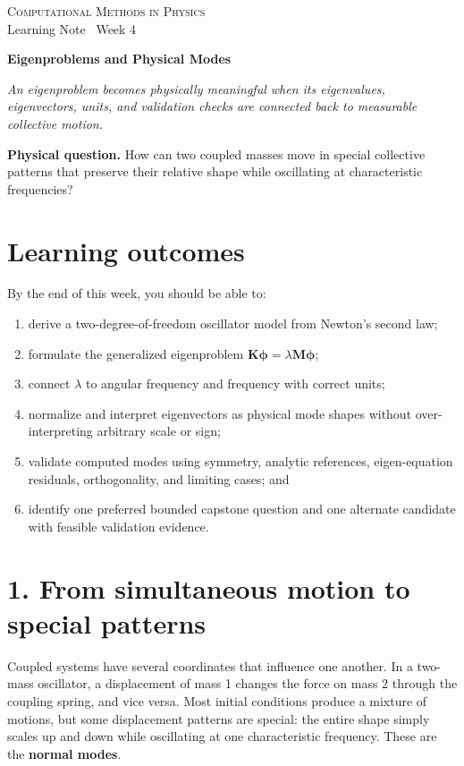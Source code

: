 \documentclass[11pt,a4paper]{article}
\newcommand{\course}{Computational Methods in Physics}
\begin{document}
{\large\textsc{\course}}\\[-2pt]
{\small Learning Note \textbar\ Week 4}\par\vspace{4pt}
{\LARGE\bfseries Eigenproblems and Physical Modes}\par\vspace{3pt}
\textit{An eigenproblem becomes physically meaningful when its eigenvalues, eigenvectors, units, and validation checks are connected back to measurable collective motion.}

\begin{keybox}
\textbf{Physical question.} How can two coupled masses move in special collective patterns that preserve their relative shape while oscillating at characteristic frequencies?
\end{keybox}

\section*{Learning outcomes}
By the end of this week, you should be able to:
\begin{enumerate}[nosep,leftmargin=5mm]
  \item derive a two-degree-of-freedom oscillator model from Newton's second law;
  \item formulate the generalized eigenproblem $\mathbf{K}\boldsymbol{\phi}=\lambda\mathbf{M}\boldsymbol{\phi}$;
  \item connect $\lambda$ to angular frequency and frequency with correct units;
  \item normalize and interpret eigenvectors as physical mode shapes without over-interpreting arbitrary scale or sign;
  \item validate computed modes using symmetry, analytic references, eigen-equation residuals, orthogonality, and limiting cases; and
  \item identify one preferred bounded capstone question and one alternate candidate with feasible validation evidence.
\end{enumerate}

\section*{1. From simultaneous motion to special patterns}
Coupled systems have several coordinates that influence one another. In a two-mass oscillator, a displacement of mass 1 changes the force on mass 2 through the coupling spring, and vice versa. Most initial conditions produce a mixture of motions, but some displacement patterns are special: the entire shape simply scales up and down while oscillating at one characteristic frequency. These are the \textbf{normal modes}.
\end{document}
